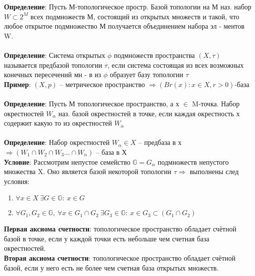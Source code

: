 	\textbf{Определение}: Пусть М-топологическое  простр. Базой топологии на М наз. набор $W \subset 2^M$ всех подмножеств М, состоящий из открытых множеств и такой, что любое открытое подмножество М получается объединением набора эл - ментов W.\\
	\\
	\textbf{Определение}: Система открытых $\phi$ подмножеств пространства $(X,\tau)$ называется предбазой топологии $\tau$, если система состоящая из всех возможных конечных пересечений мн - в из $\phi$ образует базу топологии $\tau$\\
	\textbf{Пример}: $(X,p)$ -- метрическое пространство $\Rightarrow (Br(x): x \in X, r>0)$-база\\
	\\
	\textbf{Определение}: Пусть М топологическое пространство, а х $\in$ M-точка. Набор окрестностей $W_{\alpha}$ наз. базой окрестностей в точке, если каждая окрестность х содержит какую то из окрестностей $W_{\alpha}$\\
	\\
	\textbf{Определение}: Набор окрестностей $W_{\alpha} \in X$ -- предбаза в х $\Rightarrow (W_1\cap W_2 \cap W_3 \ldots \cap W_n)$ -- база в Х\\
	\textbf{Условие}: Рассмотрим непустое семейство $\mathbb{G} = G_{\alpha}$ подмножеств непустого множества X. Оно является базой некоторой топологии $\tau \Rightarrow$ выполнены след условия:
	\begin{enumerate}
		\item $\forall x\in X\ \exists G \in \mathbb{G}:\ x \in G$
		\item $\forall G_1, G_2 \in \mathbb{G},\ \forall x \in G_1 \cap G_2\ \exists G_3 \in \mathbb{G}:\ x \in G_3 \subset (G_1 \cap G_2)$
	\end{enumerate}
	\textbf{Первая аксиома счетности}: топологическое пространство обладает счётной базой в точке, если у каждой точки есть небольше чем счетная база окрестностей.\\
	\textbf{Вторая аксиома счетности}: топологическое пространство обладает счётной базой, если у него есть не более чем счетная база открытых множеств.\\

\newpage
